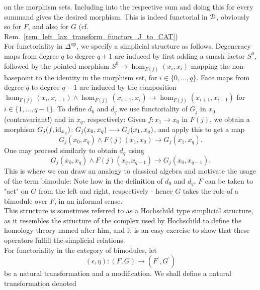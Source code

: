 \begin{defn}
    on the morphism sets.
    Including into the respective sum and doing this for every summand gives
    the desired morphism. This is indeed functorial in $\mathcal{D}$, obviously so for
    $F$, and also for $G$ (cf.
    Rem.~\ref{rem_left_lax_transform_functors_J_to_CAT})\\
    For functoriality in $\Delta^{\mathrm{op}}$, we specify a simplicial
    structure as follows.
    Degeneracy maps from degree $q$ to degree $q+1$ are induced by first
    adding a smash factor $S^0$, followed by the pointed morphism $S^0 \to
    \hom_{F(j)}(x_i,x_i)$ mapping the non-basepoint to the identity in the
    morphism set, for $i \in \{ 0, \ldots, q \}$.  Face maps from degree $q$
    to degree $q-1$ are induced by the composition $\hom_{F(j)}(x_i,x_{i-1})
    \wedge \hom_{F(j)}(x_{i+1},x_i) \to \hom_{F(j)}(x_{i+1},x_{i-1})$ for $i
    \in \{ 1, \ldots, q-1 \}$.  To define $d_0$ and $d_q$ we use functoriality
    of $G_j$ in $x_0$ (contravariant!) and in $x_q$, respectively: Given $f:
    x_1 \to x_0$ in $F(j)$, we obtain a morphism $G_j(f,\operatorname{id}_{x_q}) \colon
    G_j(x_0,x_q) \longrightarrow G_j(x_1,x_q)$, and apply this to get a map
    \begin{displaymath}
      G_j(x_0,x_q) \wedge F(j)(x_1,x_0) \to G_j(x_1,x_q).
    \end{displaymath}
    One may proceed similarly to obtain $d_q$ using
    \begin{displaymath}
      G_j(x_0,x_q) \wedge F(j)(x_q,x_{q-1}) \to G_j(x_0,x_{q-1}).
    \end{displaymath}
    This is where we can draw an analogy to classical algebra and motivate the
    usage of the term bimodule: Note how in the definition of $d_0$ and $d_q$,
    $F$ can be taken to "act" on $G$ from the left and right, respectively -
    hence $G$ takes the role of a bimodule over $F$, in an informal sense.\\
    This structure is sometimes referred to as a Hochschild type simplicial
    structure, as it resembles the structure of the complex used by Hochschild
    to define the homology theory named after him, and it is an easy exercise
    to show that these operators fulfill the simplicial relations.\\
    For functoriality in the category of bimodules, let
    \begin{displaymath}
      (\epsilon, \eta) \colon (F,G) \to (F^\prime, G^\prime)
    \end{displaymath}
    be a natural transformation and a modification.
    We shall define a natural transformation denoted

\end{defn}
